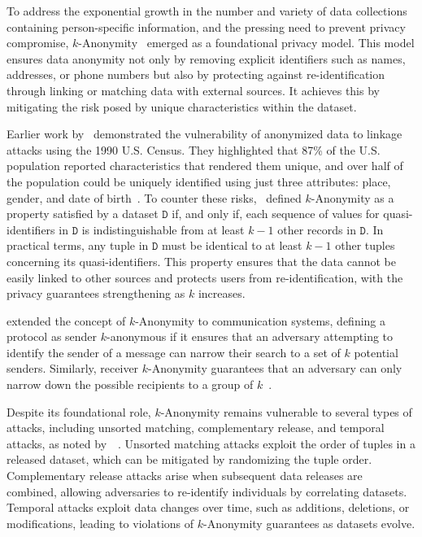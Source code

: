 To address the exponential growth in the number and variety of data collections containing person-specific information, and the pressing need to prevent privacy compromise, \(k\)-Anonymity~\cite{KAnonSweeney} emerged as a foundational privacy model. This model ensures data anonymity not only by removing explicit identifiers such as names, addresses, or phone numbers but also by protecting against re-identification through linking or matching data with external sources. It achieves this by mitigating the risk posed by unique characteristics within the dataset.

Earlier work by~\citeauthor{KAnonSweeney} demonstrated the vulnerability of anonymized data to linkage attacks using the 1990 U.S. Census. They highlighted that 87\% of the U.S. population reported characteristics that rendered them unique, and over half of the population could be uniquely identified using just three attributes: place, gender, and date of birth~\cite{IdentifyPeopleSweeney}. To counter these risks,~\citeauthor{KAnonSweeney} defined \(k\)-Anonymity as a property satisfied by a dataset \(\texttt{D}\) if, and only if, each sequence of values for quasi-identifiers in \(\texttt{D}\) is indistinguishable from at least \(k-1\) other records in \(\texttt{D}\). In practical terms, any tuple in \(\texttt{D}\) must be identical to at least \(k-1\) other tuples concerning its quasi-identifiers. This property ensures that the data cannot be easily linked to other sources and protects users from re-identification, with the privacy guarantees strengthening as \(k\) increases.

\citeauthor{KAnoMsgTrans} extended the concept of \(k\)-Anonymity to communication systems, defining a protocol as sender \(k\)-anonymous if it ensures that an adversary attempting to identify the sender of a message can narrow their search to a set of \(k\) potential senders. Similarly, receiver \(k\)-Anonymity guarantees that an adversary can only narrow down the possible recipients to a group of \(k\)~\cite{KAnoMsgTrans}.

Despite its foundational role, \(k\)-Anonymity remains vulnerable to several types of attacks, including unsorted matching, complementary release, and temporal attacks, as noted by~\citeauthor{KAnonSweeney}~\cite{KAnonSweeney}. Unsorted matching attacks exploit the order of tuples in a released dataset, which can be mitigated by randomizing the tuple order. Complementary release attacks arise when subsequent data releases are combined, allowing adversaries to re-identify individuals by correlating datasets. Temporal attacks exploit data changes over time, such as additions, deletions, or modifications, leading to violations of \(k\)-Anonymity guarantees as datasets evolve.

